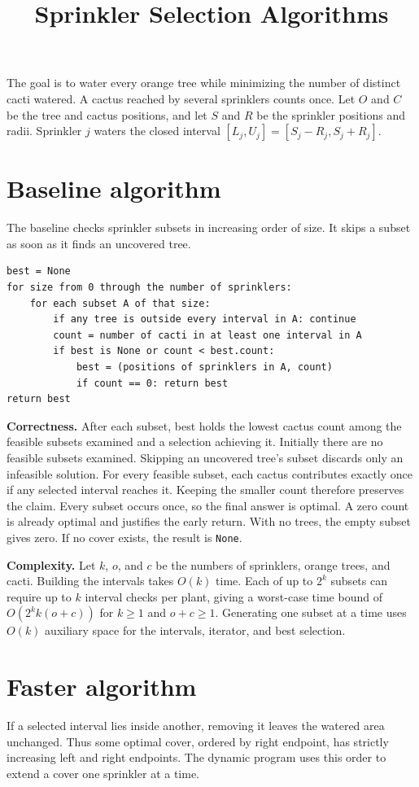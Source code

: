 \documentclass[11pt]{article}
\title{Sprinkler Selection Algorithms}
\author{}
\date{}
\begin{document}
\maketitle
The goal is to water every orange tree while minimizing the number of distinct cacti watered. A cactus reached by several sprinklers counts once. Let $O$ and $C$ be the tree and cactus positions, and let $S$ and $R$ be the sprinkler positions and radii. Sprinkler $j$ waters the closed interval $[L_j,U_j]=[S_j-R_j,S_j+R_j]$.

\section{Baseline algorithm}
The baseline checks sprinkler subsets in increasing order of size. It skips a subset as soon as it finds an uncovered tree.
\begin{verbatim}
best = None
for size from 0 through the number of sprinklers:
    for each subset A of that size:
        if any tree is outside every interval in A: continue
        count = number of cacti in at least one interval in A
        if best is None or count < best.count:
            best = (positions of sprinklers in A, count)
            if count == 0: return best
return best
\end{verbatim}
\textbf{Correctness.} After each subset, best holds the lowest cactus count among the feasible subsets examined and a selection achieving it. Initially there are no feasible subsets examined. Skipping an uncovered tree's subset discards only an infeasible solution. For every feasible subset, each cactus contributes exactly once if any selected interval reaches it. Keeping the smaller count therefore preserves the claim. Every subset occurs once, so the final answer is optimal. A zero count is already optimal and justifies the early return. With no trees, the empty subset gives zero. If no cover exists, the result is \texttt{None}.

\textbf{Complexity.} Let $k$, $o$, and $c$ be the numbers of sprinklers, orange trees, and cacti. Building the intervals takes $O(k)$ time. Each of up to $2^k$ subsets can require up to $k$ interval checks per plant, giving a worst-case time bound of $O(2^k k(o+c))$ for $k\ge1$ and $o+c\ge1$. Generating one subset at a time uses $O(k)$ auxiliary space for the intervals, iterator, and best selection.

\newpage
\section{Faster algorithm}
If a selected interval lies inside another, removing it leaves the watered area unchanged. Thus some optimal cover, ordered by right endpoint, has strictly increasing left and right endpoints. The dynamic program uses this order to extend a cover one sprinkler at a time.
\end{document}
